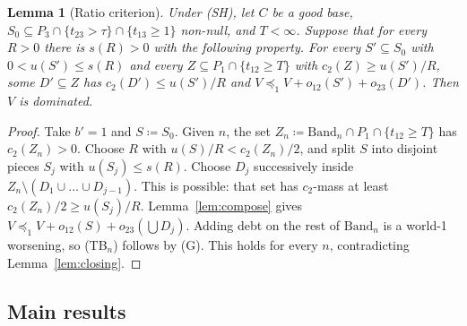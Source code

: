 \documentclass[11pt]{article}
\newtheorem{lemma}[theorem]{Lemma}
\theoremstyle{definition}\newtheorem{definition}[theorem]{Definition}
\theoremstyle{remark}\newtheorem{remark}[theorem]{Remark}
\begin{document}
\begin{lemma}[Ratio criterion]\label{lem:ratio}
Under (SH), let $C$ be a good base, $S_0\subseteq P_3\cap\{t_{23}>\tau\}\cap
\{t_{13}\ge1\}$ non-null, and $T<\infty$. Suppose that for every $R>0$ there
is $s(R)>0$ with the following property. For every $S'\subseteq S_0$ with
$0<u(S')\le s(R)$ and every $Z\subseteq P_1\cap\{t_{12}\ge T\}$ with
$c_2(Z)\ge u(S')/R$, some $D'\subseteq Z$ has $c_2(D')\le u(S')/R$ and
$V\preceq_1V+o_{12}(S')+o_{23}(D')$. Then $V$ is dominated.
\end{lemma}
\begin{proof}
Take $b'=1$ and $S\coloneqq S_0$. Given $n$, the set
$Z_n\coloneqq\mathrm{Band}_n\cap P_1\cap\{t_{12}\ge T\}$ has $c_2(Z_n)>0$.
Choose $R$ with $u(S)/R<c_2(Z_n)/2$, and split $S$ into disjoint pieces $S_j$
with $u(S_j)\le s(R)$. Choose $D_j$ successively inside
$Z_n\setminus(D_1\cup\dots\cup D_{j-1})$. This is possible: that set has
$c_2$-mass at least $c_2(Z_n)/2\ge u(S_j)/R$. Lemma~\ref{lem:compose} gives
$V\preceq_1V+o_{12}(S)+o_{23}(\bigcup D_j)$. Adding debt on the rest of
$\mathrm{Band}_n$ is a world-1 worsening, so (TB$_n$) follows by (G). This
holds for every $n$, contradicting Lemma~\ref{lem:closing}.
\end{proof}

\subsection*{Main results}
\end{document}
